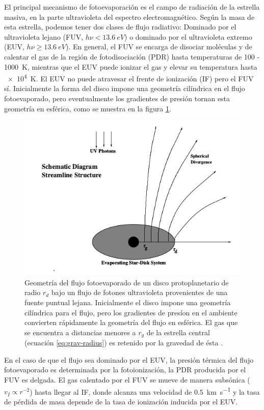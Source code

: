El principal mecanismo de fotoevaporación es el campo de radiación de la estrella masiva, en la parte ultravioleta del espectro electromagnético. Según la masa de esta estrella, podemos tener dos clases de flujo radiativo: Dominado por el ultravioleta lejano (FUV, $h\nu < \SI{13.6}{eV}$) o dominado por el ultravioleta extremo (EUV, $h\nu \geq \SI{13.6}{eV}$). En general, el FUV se encarga de disociar moléculas y de calentar el gas de la región de fotodisociación (PDR) hasta temperaturas de \SI{100}{} - \SI{1000}{K}, mientras que el EUV puede ionizar el gas y elevar su temperatura hasta \SI{e4}{K}. El EUV no puede atravesar el frente de ionización (IF) pero el FUV sí. Inicialmente la forma del disco impone una geometría cilíndrica en el flujo fotoevaporado, pero eventualmente los gradientes de presión tornan esta geometría en esférica, como se muestra en la figura \ref{fig:flux-geometry}.

\begin{figure}
  \centering
  \includegraphics[width=0.7\linewidth]{./Figures/Johnstone-1}
  \caption[Geometría del flujo fotoevaporado]{Geometría del flujo fotoevaporado de un disco protoplanetario de radio $r_d$ bajo un flujo de fotones ultravioleta provenientes de una fuente puntual lejana. Inicialmente el disco impone una geometría cilíndrica para el flujo, pero los gradientes de presíon en el ambiente convierten rápidamente la geometría del flujo en esférica. El gas que se encuentra a distancias menores a $r_g$ de la estrella central (ecuación \ref{eq:grav-radius}) es retenido por la gravedad de ésta \citep{Johnstone:1998}.}
  \label{fig:flux-geometry}
\end{figure}

En el caso de que el flujo sea dominado por el EUV, la presión térmica del flujo fotoevaporado es determinada por la fotoionización, la PDR producida por el FUV es delgada. El gas calentado por el FUV se mueve de manera subsónica ($v_I \propto r^{-2}$) hasta llegar al IF, donde alcanza una velocidad de \SI{0.5}{km.s^{-1}} y la tasa de pérdida de masa depende de la tasa de ionización inducida por el EUV.

